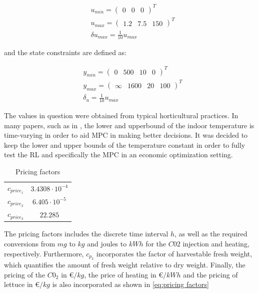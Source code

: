 \begin{equation}\label{eq:input constraints}
	\begin{aligned}
		&u_{min} = \begin{pmatrix}
			0&0&0
		\end{pmatrix}^T \\
	&u_{max} = \begin{pmatrix}
		1.2&7.5&150
	\end{pmatrix}^T	\\
& \delta u_{max} = \frac{1}{10} u_{max}
	\end{aligned}
\end{equation}

and the state constraints are defined as:

\begin{equation}\label{eq:state constraints}
	\begin{aligned}
		&y_{min} = \begin{pmatrix}
			0&500&10&0
		\end{pmatrix}^T \\
		&y_{max} = \begin{pmatrix}
			\infty&1600&20&100
		\end{pmatrix}^T	\\
		& \delta_u = \frac{1}{10} u_{max}
	\end{aligned}
\end{equation}

The values in question were obtained from typical horticultural practices. In many papers, such as in \cite{boersmaRobustSamplebasedModel2022}, the lower and upperbound of the indoor temperature is time-varying in order to aid MPC in making better decisions. It was decided to keep the lower and upper bounds of the temperature constant in order to fully test the RL and specifically the MPC in an economic optimization setting.

\begin{table}[H]
	\centering
	\begin{tabular}{|c c|}
		\hline
		$c_{price_1}$& $3.4308\cdot 10^{-4}$ \\
		$c_{price_2}$& $6.405\cdot 10^{-5}$\\
		$c_{price_3}$& $22.285$\\ 
		\hline
	\end{tabular}
	\caption{Pricing factors}
	\label{tab:pricing factors}
\end{table}

The pricing factors includes the discrete time interval $h$, as well as the required conversions from $mg$ to $kg$ and joules to $kWh$ for the $C02$ injection and heating, respectively. Furthermore, $c_{p_3}$ incorporates the factor of harvestable fresh weight, which quantifies the amount of fresh weight relative to dry weight. Finally, the pricing of the $C0_2$ in \euro $/kg$, the price of heating in \euro$/kWh$ and the pricing of lettuce in \euro$/kg$ is also incorporated as shown in \autoref{eq:pricing factors}

